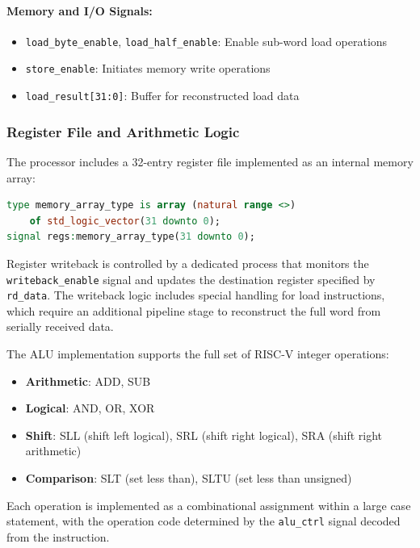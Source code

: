\documentclass[12pt]{article}
\begin{document}
\paragraph{Memory and I/O Signals:}
\begin{itemize}
    \item \texttt{load\_byte\_enable}, \texttt{load\_half\_enable}: Enable sub-word load operations
    \item \texttt{store\_enable}: Initiates memory write operations
    \item \texttt{load\_result[31:0]}: Buffer for reconstructed load data
\end{itemize}

\subsubsection{Register File and Arithmetic Logic}

The processor includes a 32-entry register file implemented as an internal memory array:

\begin{lstlisting}[language=VHDL]
type memory_array_type is array (natural range <>) 
    of std_logic_vector(31 downto 0);
signal regs:memory_array_type(31 downto 0);
\end{lstlisting}

Register writeback is controlled by a dedicated process that monitors the \texttt{writeback\_enable} signal and updates the destination register specified by \texttt{rd\_data}. The writeback logic includes special handling for load instructions, which require an additional pipeline stage to reconstruct the full word from serially received data.

The ALU implementation supports the full set of RISC-V integer operations:
\begin{itemize}
    \item \textbf{Arithmetic}: ADD, SUB
    \item \textbf{Logical}: AND, OR, XOR
    \item \textbf{Shift}: SLL (shift left logical), SRL (shift right logical), SRA (shift right arithmetic)
    \item \textbf{Comparison}: SLT (set less than), SLTU (set less than unsigned)
\end{itemize}

Each operation is implemented as a combinational assignment within a large case statement, with the operation code determined by the \texttt{alu\_ctrl} signal decoded from the instruction.
\end{document}
